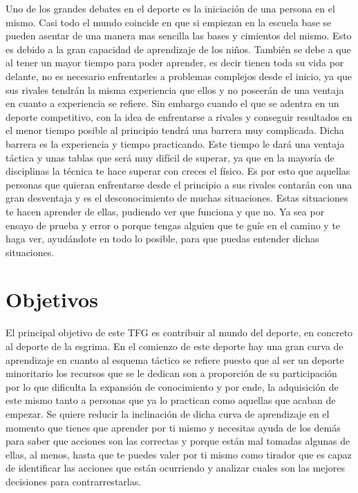 Uno de los grandes debates en el deporte es la iniciación de una persona
en el mismo. Casi todo el mundo coincide en que si empiezan en la escuela base se pueden
asentar de una manera mas sencilla las bases y cimientos del mismo. Esto es debido
a la gran capacidad de aprendizaje de los niños. También se debe a que al tener
un mayor tiempo para poder aprender, es decir tienen toda su vida por delante,
no es necesario enfrentarles a problemas complejos desde el inicio, ya que
sus rivales tendrán la misma experiencia que ellos y no poseerán de una
ventaja en cuanto a experiencia se refiere. Sin embargo cuando el que se adentra
en un deporte competitivo, con la idea de enfrentarse a rivales y conseguir resultados
en el menor tiempo posible al principio tendrá una barrera muy complicada. Dicha barrera
es la experiencia y tiempo practicando. Este tiempo le dará una ventaja táctica y unas tablas
que será muy difícil de superar, ya que en la mayoría de disciplinas la técnica
te hace superar con creces el físico. Es por esto que aquellas personas que
quieran enfrentarse desde el principio a sus rivales contarán con una gran
desventaja y es el desconocimiento de muchas situaciones. Estas situaciones
te hacen aprender de ellas, pudiendo ver que funciona y que no. Ya sea por
ensayo de prueba y error o porque tengas alguien que te guíe en el camino
y te haga ver, ayudándote en todo lo posible, para que puedas entender
dichas situaciones.

\section{Objetivos}

El principal objetivo de este TFG es contribuir al mundo del deporte, en concreto al
 deporte de la esgrima. En el comienzo de este deporte hay una gran curva de aprendizaje
 en cuanto al esquema táctico se refiere puesto que al ser un deporte minoritario los
 recursos que se le dedican son a proporción de su participación por lo que dificulta la expansión de conocimiento
 y por ende, la adquisición de este mismo tanto a personas que ya lo practican como aquellas
 que acaban de empezar. Se quiere reducir la inclinación de dicha curva de aprendizaje
 en el momento que tienes que aprender por ti mismo y necesitas ayuda de los demás
 para saber que acciones son las correctas y porque están mal tomadas algunas de ellas,
 al menos, hasta que te puedes valer por ti mismo como tirador que es capaz de identificar
 las acciones que están ocurriendo y analizar cuales son las mejores decisiones para contrarrestarlas.

